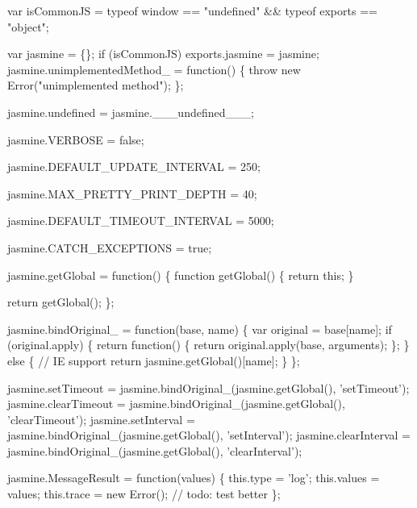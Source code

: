 \begin{DoxyCodeInclude}
var isCommonJS = typeof window == \textcolor{stringliteral}{"undefined"} && typeof exports == \textcolor{stringliteral}{"object"};

var jasmine = \{\};
\textcolor{keywordflow}{if} (isCommonJS) exports.jasmine = jasmine;
jasmine.unimplementedMethod\_ = \textcolor{keyword}{function}() \{
  \textcolor{keywordflow}{throw} \textcolor{keyword}{new} Error(\textcolor{stringliteral}{"unimplemented method"});
\};

jasmine.undefined = jasmine.\_\_\_undefined\_\_\_;

jasmine.VERBOSE = \textcolor{keyword}{false};

jasmine.DEFAULT\_UPDATE\_INTERVAL = 250;

jasmine.MAX\_PRETTY\_PRINT\_DEPTH = 40;

jasmine.DEFAULT\_TIMEOUT\_INTERVAL = 5000;

jasmine.CATCH\_EXCEPTIONS = \textcolor{keyword}{true};

jasmine.getGlobal = \textcolor{keyword}{function}() \{
  \textcolor{keyword}{function} getGlobal() \{
    \textcolor{keywordflow}{return} \textcolor{keyword}{this};
  \}

  \textcolor{keywordflow}{return} getGlobal();
\};

jasmine.bindOriginal\_ = \textcolor{keyword}{function}(base, name) \{
  var original = base[name];
  \textcolor{keywordflow}{if} (original.apply) \{
    \textcolor{keywordflow}{return} \textcolor{keyword}{function}() \{
      \textcolor{keywordflow}{return} original.apply(base, arguments);
    \};
  \} \textcolor{keywordflow}{else} \{
    \textcolor{comment}{// IE support}
    \textcolor{keywordflow}{return} jasmine.getGlobal()[name];
  \}
\};

jasmine.setTimeout = jasmine.bindOriginal\_(jasmine.getGlobal(), \textcolor{stringliteral}{'setTimeout'});
jasmine.clearTimeout = jasmine.bindOriginal\_(jasmine.getGlobal(), \textcolor{stringliteral}{'clearTimeout'});
jasmine.setInterval = jasmine.bindOriginal\_(jasmine.getGlobal(), \textcolor{stringliteral}{'setInterval'});
jasmine.clearInterval = jasmine.bindOriginal\_(jasmine.getGlobal(), \textcolor{stringliteral}{'clearInterval'});

jasmine.MessageResult = \textcolor{keyword}{function}(values) \{
  this.type = \textcolor{stringliteral}{'log'};
  this.values = values;
  this.trace = \textcolor{keyword}{new} Error(); \textcolor{comment}{// todo: test better}
\};


\end{DoxyCodeInclude}
